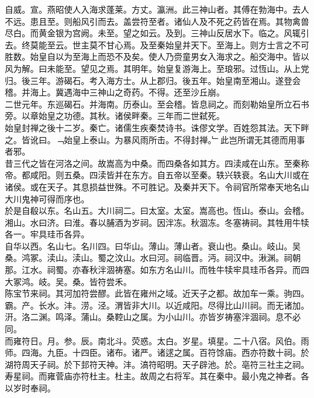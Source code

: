 \documentclass{zhvt-classic}
\begin{document}
\hspace*{2em}自威。宣。燕昭使人入海求蓬莱。方丈。瀛洲。此三神山者。其傅在勃海中。去人不远。患且至。则船风引而去。盖尝符至者。诸仙人及不死之药皆在焉。其物禽兽尽白。而黄金银为宫阙。未至。望之如云。及到。三神山反居水下。临之。风辄引去。终莫能至云。世主莫不甘心焉。及至秦始皇并天下。至海上。则方士言之不可胜数。始皇自以为至海上而恐不及矣。使人乃赍童男女入海求之。船交海中。皆以风为解。曰未能至。望见之焉。其明年。始皇复游海上。至琅邪。过恆山。从上党归。後三年。游碣石。考入海方士。从上郡归。後五年。始皇南至湘山。遂登会稽。并海上。冀遇海中三神山之奇药。不得。还至沙丘崩。\\
\hspace*{2em}二世元年。东巡碣石。并海南。历泰山。至会稽。皆息祠之。而刻勒始皇所立石书旁。以章始皇之功德。其秋。诸侯畔秦。三年而二世弑死。\\
\hspace*{2em}始皇封禅之後十二岁。秦亡。诸儒生疾秦焚诗书。诛僇文学。百姓怨其法。天下畔之。皆讹曰。﹁始皇上泰山。为暴风雨所击。不得封禅。﹂此岂所谓无其德而用事者邪。\\
\hspace*{2em}昔三代之皆在河洛之间。故嵩高为中桑。而四桑各如其方。四渎咸在山东。至秦称帝。都咸阳。则五桑。四渎皆并在东方。自五帝以至秦。轶兴轶衰。名山大川或在诸侯。或在天子。其息损益世殊。不可胜记。及秦并天下。令祠官所常奉天地名山大川鬼神可得而序也。\\
\hspace*{2em}於是自殽以东。名山五。大川祠二。曰太室。太室。嵩高也。恆山。泰山。会稽。湘山。水曰济。曰淮。春以脯酒为岁祠。因泮冻。秋涸冻。冬塞祷祠。其牲用牛犊各一。牢具珪币各异。\\
\hspace*{2em}自华以西。名山七。名川四。曰华山。薄山。薄山者。衰山也。桑山。岐山。吴桑。鸿冢。渎山。渎山。蜀之汶山。水曰河。祠临晋。沔。祠汉中。湫渊。祠朝那。江水。祠蜀。亦春秋泮涸祷塞。如东方名山川。而牲牛犊牢具珪币各异。而四大冢鸿。岐。吴。桑。皆符尝禾。\\
\hspace*{2em}陈宝节来祠。其河加符尝醪。此皆在雍州之域。近天子之都。故加车一乘。驹四。\\
\hspace*{2em}霸。产。长水。沣。涝。泾。渭皆非大川。以近咸阳。尽得比山川祠。而无诸加。\\
\hspace*{2em}汧。洛二渊。鸣泽。蒲山。桑鞚山之属。为小山川。亦皆岁祷塞泮涸祠。息不必同。\\
\hspace*{2em}而雍符日。月。参。辰。南北斗。荧惑。太白。岁星。填星。二十八宿。风伯。雨师。四海。九臣。十四臣。诸布。诸严。诸逑之属。百符馀庙。西亦符数十祠。於湖符周天子祠。於下邽符天神。沣。滈符昭明。天子辟池。於。亳符三社主之祠。寿星祠。而雍菅庙亦符杜主。杜主。故周之右将军。其在秦中。最小鬼之神者。各以岁时奉祠。\\
\end{document}
